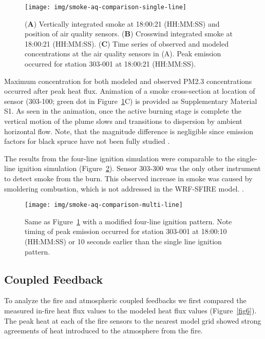 \documentclass[preprints,article,accept,moreauthors,pdftex]{Definitions/mdpi}
\begin{document}
\begin{figure}[H]
\centering
 \texttt{[image: img/smoke-aq-comparison-single-line]}
 \caption{(\textbf{A}) Vertically integrated smoke at 18:00:21 (HH:MM:SS) and position of air quality sensors. (\textbf{B}) Crosswind integrated smoke at 18:00:21 (HH:MM:SS). (\textbf{C}) Time series of observed and modeled concentrations at the air quality sensors in (A). Peak emission occurred for station 303-001 at 18:00:21 (HH:MM:SS).\label{fig4}}
 \end{figure}

Maximum concentration for both modeled and observed PM2.3 concentrations occurred after peak heat flux.
Animation of a smoke cross-section at location of sensor (303-100; green dot in Figure~\ref{fig4}C) is provided as Supplementary Material S1. As seen in the animation, once the active burning stage is complete
the vertical motion of the plume slows and transitions to dispersion by ambient horizontal flow. Note, that the magnitude difference is negligible since emission factors for black spruce have not been fully studied \cite{prichard_wildland_2020}.

The results from the four-line ignition simulation were comparable to the single-line ignition simulation (Figure~\ref{fig5}). Sensor 303-300 was the only other instrument to detect smoke from the burn. This observed increase in smoke was caused by smoldering combustion, which is not addressed in the WRF-SFIRE model. \cite{mallia_incorporating_2020,mandel_coupled_2011,mandel_recent_2014}.

\begin{figure}[H]
\centering
 \texttt{[image: img/smoke-aq-comparison-multi-line]}
 \caption{Same as Figure~\ref{fig4} with a modified four-line ignition pattern.  Note timing of peak emission occurred for station 303-001 at 18:00:10 (HH:MM:SS) or 10 seconds earlier than the single line ignition pattern.\label{fig5}}
 \end{figure}


\subsection{Coupled Feedback}

To analyze the fire and atmospheric coupled feedbacks we first compared the measured in-fire heat flux values to the modeled heat flux values (Figure~\ref{fig6}). The peak heat at each of the fire sensors to the nearest model grid showed strong agreements of heat introduced to the atmosphere from the fire.
\end{document}

